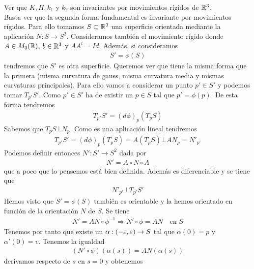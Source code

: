 \begin{ejercicio}
    Ver que $K, H, k_1$ y $k_2$ son invariantes por movimientos rígidos de $\mathbb{R}^3$.\\

    Basta ver que la segunda forma fundamental es invariante por movimientos rígidos. Para ello tomamos $S\subset \mathbb{R}^3$ una superficie orientada mediante la aplicación $N : S \to S^2$. Consideramos también el movimiento rígido
    donde $A\in M_3(\mathbb{R})$, $b\in \mathbb{R}^3$ y $AA^t = Id$. Además, si consideramos
    \begin{gather*}
        S' = \phi(S)
    \end{gather*}
    tendremos que $S'$ es otra superficie. Queremos ver que tiene la misma forma que la primera (misma curvatura de gauss, misma curvatura media y mismas curvaturas principales). Para ello vamos a considerar un punto $p'\in S'$ y podemos tomar $T_{p'}S'$. Como $p'\in S'$ ha de existir un $p\in S$ tal que $p'=\phi(p)$. De esta forma tendremos 
    \begin{gather*}
        T_{p'}S' = (d\phi)_p(T_pS)
    \end{gather*}
    Sabemos que $T_pS \bot N_p$. Como es una aplicación lineal tendremos
    \begin{gather*}
        T_{p'}S' = (d\phi)_p(T_pS) = A(T_pS) \bot AN_p = N'_{p'}
    \end{gather*}
    Podemos definir entonces $N': S'\to S^2$ dada por
    \begin{gather*}
        N' = A \circ N \circ A
    \end{gather*}
    que a poco que lo pensemos está bien definida. Además es diferenciable y se tiene que 
    \begin{gather*}
        N'_{p'} \bot T_{p'}S'
    \end{gather*}
    Hemos visto que $S'=\phi(S)$ también es orientable y la hemos orientado en función de la orientación $N$ de $S$. Se tiene 
    \begin{gather*}
        N' = AN\circ \phi^{-1} \Rightarrow N'\circ \phi = AN\ \ \ \text{ en }S
    \end{gather*}
    Tenemos por tanto que existe un $\alpha: (-\varepsilon, \varepsilon) \to S$ tal que $\alpha(0)=p$ y $\alpha'(0)=v$. Tenemos la igualdad
    \begin{gather*}
        (N' \circ \phi)(\alpha(s)) = AN(\alpha(s))
    \end{gather*}
    derivamos respecto de $s$ en $s=0$ y obtenemos

\end{ejercicio}

